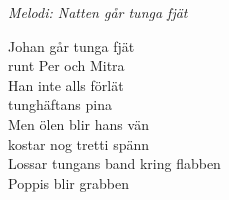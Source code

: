 {\footnotesize\textit{Melodi: Natten går tunga fjät}}\par
\vspace{10pt}
Johan går tunga fjät\\
runt Per och Mitra\\
Han inte alls förlät\\
tunghäftans pina\\
Men ölen blir hans vän\\
kostar nog tretti spänn\\
Lossar tungans band kring flabben\\
Poppis blir grabben
